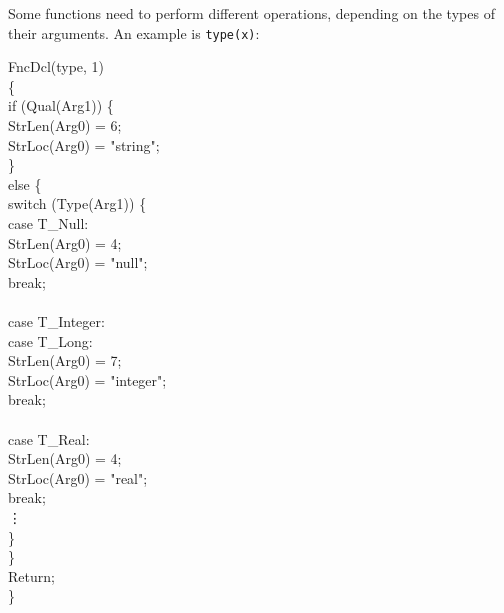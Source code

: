 Some functions need to perform different operations, depending on the
types of their arguments. An example is \texttt{type(x)}:

\goodbreak
\begin{iconcode}
\color{red}FncDcl(type, 1)\\
\{\\
\>if (Qual(Arg1)) \{\\
\>\>StrLen(Arg0) = 6;\\
\>\>StrLoc(Arg0) = "string";\\
\>\}\\
\>else \{\\
\>\>switch (Type(Arg1)) \{\\
\>\>\>case T\_Null:\\
\>\>\>\>StrLen(Arg0) = 4;\\
\>\>\>\>StrLoc(Arg0) = "null";\\
\>\>\>\>break;\\
\\
\>\>\>case T\_Integer:\\
\>\>\>case T\_Long:\\
\>\>\>\>StrLen(Arg0) = 7;\\
\>\>\>\>StrLoc(Arg0) = "integer";\\
\>\>\>\>break;\\
\\
\>\>\>case T\_Real:\\
\>\>\>\>StrLen(Arg0) = 4;\\
\>\>\>\>StrLoc(Arg0) = "real";\\
\>\>\>\>break;\\
\>\>\>\>\vdots\\
\>\>\>\}\\
\>\>\}\\
\>\>Return;\\
\>\}
\end{iconcode}

